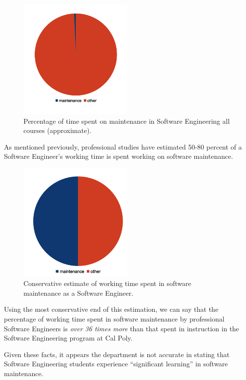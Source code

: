 \documentclass[11pt]{article}
\begin{document}
\begin{multicols}{2}
\begin{figure}[tbp!]
  \caption{Percentage of time spent on maintenance in Software Engineering all courses (approximate).}
  \centering
    \includegraphics[width=0.5\textwidth]{termpaper/images/pie-chart-03}
\end{figure}

As mentioned previously, professional studies have estimated 50-80 percent of a Software Engineer's working time is spent working on software maintenance. \cite{stark97} \cite{parekh}

\begin{figure}[tbp!]
  \caption{Conservative estimate of working time spent in software maintenance as a Software Engineer.}
  \centering
    \includegraphics[width=0.5\textwidth]{termpaper/images/pie-chart-04}
\end{figure}

Using the most conservative end of this estimation, we can say that the percentage of working time spent in software maintenance by professional Software Engineers is \emph{over 36 times more} than that spent in instruction in the Software Engineering program at Cal Poly.

Given these facts, it appears the department is not accurate in stating that Software Engineering students experience ``significant learning'' in software maintenance.


\end{multicols}
\end{document}
